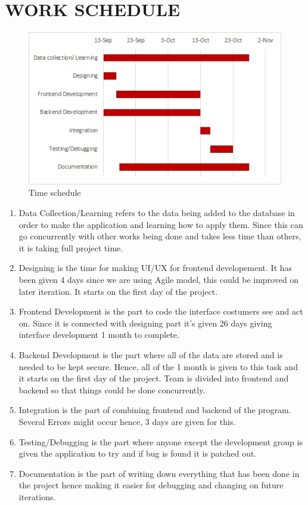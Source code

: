 \chapter{WORK SCHEDULE}
\begin{figure}[ht]
\centering
\includegraphics[width=\linewidth]{Graphics/time.JPG}
\caption{Time schedule }
\end{figure}

\begin{enumerate}[label=(\alph*)]
	\item Data Collection/Learning refers to the data being added to the database in order to make the application and learning how to apply them. Since this can go concurrently with other works being done and takes less time than others, it is taking full project time.
	\item Designing is the time for making UI/UX for frontend developement. It has been given 4 days since we are using Agile model, this could be improved on later iteration. It starts on the first day of the project.
	\item Frontend Development is the part to code the interface costumers see and act on. Since it is connected with designing part it's given 26 days giving interface development 1 month to complete. 
	\item Backend Development is the part where all of the data are stored and is needed to be kept secure. Hence, all of the 1 month is given to this task and it starts on the first day of the project. Team is divided into frontend and backend so that things could be done concurrently.
	\item Integration is the part of combining frontend and backend of the program. Several Errors might occur hence, 3 days are given for this.
	\item Testing/Debugging is the part where anyone except the development group is given the application to try and if bug is found it is patched out.
	\item Documentation is the part of writing down everything that has been done in the project hence making it easier for debugging and changing on future iterations.
\end{enumerate}
 